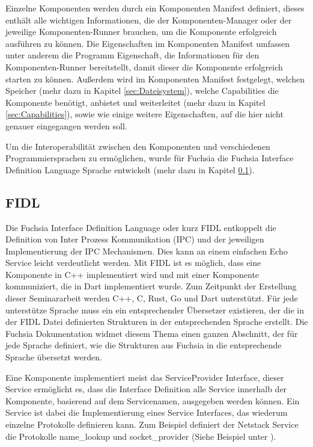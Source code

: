 \documentclass[a4paper]{scrartcl}
\begin{document}
Einzelne Komponenten werden durch ein Komponenten Manifest definiert, dieses enthält alle wichtigen Informationen, die der Komponenten-Manager oder der jeweilige Komponenten-Runner brauchen, um die Komponente erfolgreich ausführen zu können. \cite{https://fuchsia.googlesource.com/fuchsia/+/master/sdk/fidl/fuchsia.sys2/decls/component_decl.fidl} 
Die Eigenschaften im Komponenten Manifest umfassen unter anderem die Programm Eigenschaft, die Informationen für den Komponenten-Runner bereitstellt, damit dieser die Komponente erfolgreich starten zu können. Außerdem wird im Komponenten Manifest festgelegt, welchen Speicher (mehr dazu in Kapitel \ref{sec:Dateisystem}),  welche Capabilities die Komponente benötigt, anbietet und weiterleitet (mehr dazu in Kapitel \ref{sec:Capabilities}), sowie wie einige weitere Eigenschaften, auf die hier nicht genauer eingegangen werden soll.

Um die Interoperabilität zwischen den Komponenten und verschiedenen Programmiersprachen zu ermöglichen, wurde für Fuchsia die Fuchsia Interface Definition Language Sprache entwickelt (mehr dazu in Kapitel \ref{sec:FIDL}).

\subsection{FIDL}
\label{sec:FIDL}
Die Fuchsia Interface Definition Language oder kurz FIDL entkoppelt die Definition von Inter Prozess Kommunikation (IPC) und der jeweiligen Implementierung der IPC Mechanismen. Dies kann an einem einfachen Echo Service leicht verdeutlicht werden. Mit FIDL ist es möglich, dass eine Komponente in C++ implementiert wird und mit einer Komponente kommuniziert, die in Dart implementiert wurde. Zum Zeitpunkt der Erstellung dieser Seminararbeit werden C++, C, Rust, Go und Dart unterstützt. Für jede unterstütze Sprache muss ein ein entsprechender Übersetzer existieren, der die in der FIDL Datei definierten Strukturen in der entsprechenden Sprache erstellt. Die Fuchsia Dokumentation widmet diesem Thema einen ganzen Abschnitt, der für jede Sprache definiert, wie die Strukturen aus Fuchsia in die entsprechende Sprache übersetzt werden.\cite{https://fuchsia.dev/fuchsia-src/reference/fidl/bindings/overview}

Eine Komponente implementiert meist das ServiceProvider Interface, dieser Service ermöglicht es, dass die Interface Definition alle Service innerhalb der Komponente, basierend auf dem Servicenamen, ausgegeben werden können. Ein Service ist dabei die Implementierung eines Service Interfaces, das wiederum einzelne Protokolle definieren kann. Zum Beispiel definiert der Netstack Service die Protokolle name\_lookup und socket\_provider (Siehe Beispiel unter \cite{https://fuchsia.dev/fuchsia-src/concepts/components/services?hl=en}).
\end{document}
